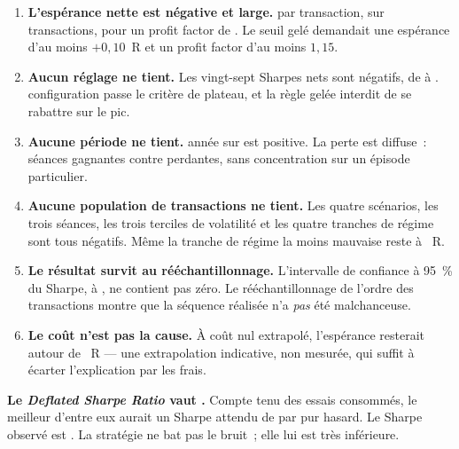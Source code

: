 \begin{enumerate}
  \item \textbf{L'espérance nette est négative et large.}
   par transaction, sur \XTenTradesIS{}
  transactions, pour un profit factor de \XTenProfitFactor. Le seuil gelé
  demandait une espérance d'au moins $+0{,}10$~R et un profit factor d'au
  moins $1{,}15$.

  \item \textbf{Aucun réglage ne tient.} Les vingt-sept Sharpes nets sont
  négatifs, de \XTenPeakSharpe{} à \XTenWorstGridSharpe.
  \XTenPlateauPassing{} configuration passe le critère de plateau, et la règle
  gelée interdit de se rabattre sur le pic.

  \item \textbf{Aucune période ne tient.} \XTenPositiveYears{} année sur
  \XTenYearsCount{} est positive. La perte est diffuse~:
  \XTenProfitableSessions{} séances gagnantes contre
  \XTenLosingSessions{} perdantes, sans concentration sur un épisode
  particulier.

  \item \textbf{Aucune population de transactions ne tient.} Les quatre
  scénarios, les trois séances, les trois terciles de volatilité et les
  quatre tranches de régime sont tous négatifs. Même la tranche de régime
   la moins mauvaise reste à \XTenBestDollarBandR{}~R.

  \item \textbf{Le résultat survit au rééchantillonnage.} L'intervalle de
  confiance à 95~\% du Sharpe, \XTenSharpeCILow{} à \XTenSharpeCIHigh, ne
  contient pas zéro. Le rééchantillonnage de l'ordre des transactions montre
  que la séquence réalisée n'a \emph{pas} été malchanceuse.

  \item \textbf{Le coût n'est pas la cause.} À coût nul extrapolé,
  l'espérance resterait autour de \XTenZeroCostExtrapolation{}~R --- une
  extrapolation indicative, non mesurée, qui suffit à écarter l'explication
  par les frais.
\end{enumerate}

\begin{warningbox}
\textbf{Le \emph{Deflated Sharpe Ratio} vaut \XTenDSR.} Compte tenu des
\XTenTrialsCount{} essais consommés, le meilleur d'entre eux aurait un Sharpe
attendu de \XTenExpectedMaxSharpe{} par pur hasard. Le Sharpe observé est
\XTenSharpeIS. La stratégie ne bat pas le bruit~; elle lui est très
inférieure.
\end{warningbox}

